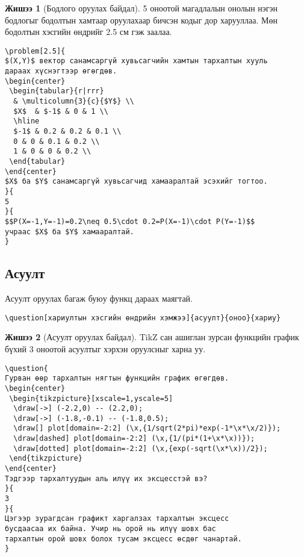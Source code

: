 \documentclass[10pt]{article}
\theoremstyle{definition}
\newtheorem{example}{Жишээ}
\begin{document}
\begin{example}[Бодлого оруулах байдал]
5 оноотой магадлалын онолын нэгэн бодлогыг бодолтын хамтаар оруулахаар бичсэн кодыг дор харууллаа. Мөн бодолтын хэсгийн өндрийг 2.5 см гэж заалаа.
\begin{verbatim}
\problem[2.5]{
$(X,Y)$ вектор санамсаргүй хувьсагчийн хамтын тархалтын хууль 
дараах хүснэгтээр өгөгдөв.
\begin{center}
 \begin{tabular}{r|rrr}
  & \multicolumn{3}{c}{$Y$} \\
  $X$  & $-1$ & 0 & 1 \\
  \hline
  $-1$ & 0.2 & 0.2 & 0.1 \\
  0 & 0 & 0.1 & 0.2 \\
  1 & 0 & 0 & 0.2 \\
 \end{tabular}
\end{center}
$X$ ба $Y$ санамсаргүй хувьсагчид хамааралтай эсэхийг тогтоо.
}{
5
}{
$$P(X=-1,Y=-1)=0.2\neq 0.5\cdot 0.2=P(X=-1)\cdot P(Y=-1)$$
учраас $X$ ба $Y$ хамааралтай.
}
\end{verbatim}
\end{example}

\subsection{Асуулт}

Асуулт оруулах багаж буюу функц дараах маягтай.
\begin{verbatim}
\question[хариултын хэсгийн өндрийн хэмжээ]{асуулт}{оноо}{хариу}
\end{verbatim}

\begin{example}[Асуулт оруулах байдал]
TikZ сан ашиглан зурсан функцийн график бүхий 3 оноотой асуултыг хэрхэн оруулсныг харна уу.
\begin{verbatim}
\question{
Гурван өөр тархалтын нягтын функцийн график өгөгдөв.
\begin{center}
 \begin{tikzpicture}[xscale=1,yscale=5]
  \draw[->] (-2.2,0) -- (2.2,0);
  \draw[->] (-1.8,-0.1) -- (-1.8,0.5);
  \draw[] plot[domain=-2:2] (\x,{1/sqrt(2*pi)*exp(-1*\x*\x/2)});
  \draw[dashed] plot[domain=-2:2] (\x,{1/(pi*(1+\x*\x))});
  \draw[dotted] plot[domain=-2:2] (\x,{exp(-sqrt(\x*\x))/2});
 \end{tikzpicture}
\end{center}
Тэдгээр тархалтуудын аль илүү их эксцесстэй вэ?
}{
3
}{
Цэгээр зурагдсан графикт харгалзах тархалтын эксцесс 
бусдаасаа их байна. Учир нь орой нь илүү шовх бас 
тархалтын орой шовх болох тусам эксцесс өсдөг чанартай.
}
\end{verbatim}
\end{example}
\end{document}
